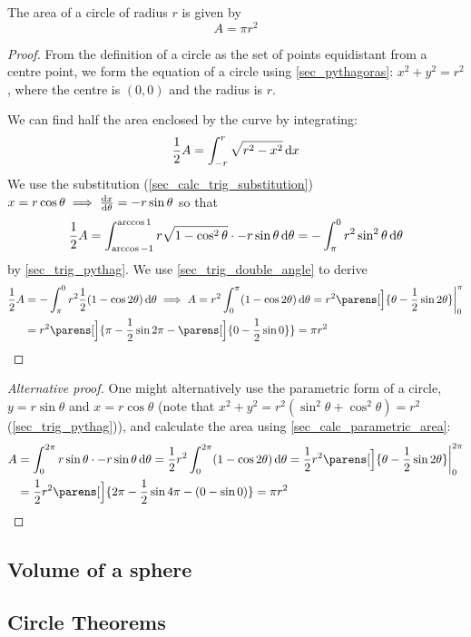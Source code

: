 \begin{theorem}
 The area of a circle of radius \(r\) is given by
 \begin{equation*}
  A = \pi r^2
 \end{equation*}
\end{theorem}
\begin{proof}
 From the definition of a circle as the set of points equidistant from a
 centre point, we form the equation of a circle using \ref{sec_pythagoras}:
 \(x^2 + y^2 = r^2\), where the centre is \((0, 0)\) and the radius is \(r\).

 We can find half the area enclosed by the curve by integrating:
 \begin{equation*}
  \frac 12 A = \integ[-r]<r>{\sqrt{r^2 - x^2}}{x}
 \end{equation*}
 We use the substitution (\ref{sec_calc_trig_substitution})
 \(x = r \cos \theta \implies \dv<x>{\theta} = -r \sin \theta\) so that
 \begin{equation*}
  \frac 12 A = \integ[\arccos -1]<\arccos 1>
  {r\sqrt{1 - \cos^2 \theta} \cdot -r \sin \theta}{\theta}
  = -\integ[\pi]<0>{r^2 \sin^2 \theta}{\theta}
 \end{equation*}
 by \ref{sec_trig_pythag}. We use \ref{sec_trig_double_angle} to derive
 \begin{align*}
  \frac 12 A &= -\integ[\pi]<0>
  {r^2 \frac 12 (1 - \cos 2 \theta)}{\theta} \implies
  A = r^2 \integ[0]<\pi>{(1 - \cos 2 \theta)}{\theta} =
  r^2\parens[\Big]{\theta - \frac 12 \sin 2 \theta}\eval_0^\pi \\
  &= r^2 \parens[\Big]{\pi - \frac 12 \sin 2 \pi -
  \parens[\Big]{0 - \frac 12 \sin 0}} = \pi r^2 \qedhere
 \end{align*}
\end{proof}
\begin{proof}[Alternative proof]
 One might alternatively use the parametric form of a circle,
 \(y = r \sin \theta\) and \(x = r \cos \theta\)
 (note that \(x^2 + y^2 = r^2(\sin^2 \theta + \cos^2 \theta) = r^2\)
 (\ref{sec_trig_pythag})), and calculate the area using
 \ref{sec_calc_parametric_area}:
 \begin{align*}
  A &= \integ[0]<2\pi>
  {r \sin \theta \cdot -r \sin \theta}{\theta} =
  \frac 12 r^2 \integ[0]<2\pi>{(1 - \cos 2 \theta)}{\theta} =
  \frac 12 r^2 \parens[\Big]{\theta - \frac 12 \sin 2 \theta}\eval_0^{2\pi} \\
  &= \frac 12 r^2 \parens[\Big]{2\pi - \frac 12 \sin 4 \pi -
  (0 - \sin 0)} = \pi r^2 \qedhere
 \end{align*}
\end{proof}

\subsection{Volume of a sphere}

\subsection{Circle Theorems}
